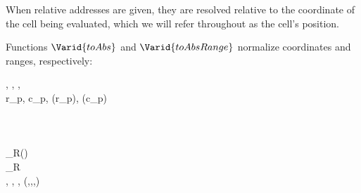 When relative addresses are given, they are resolved relative to the
coordinate of the cell being evaluated, which we will refer throughout as the
cell's position.

Functions \ensuremath{\Varid{toAbs}} and \ensuremath{\Varid{toAbsRange}} normalize coordinates and ranges, respectively:

\begin{hscode}\SaveRestoreHook
{}%
%
%
%
%
%
%
%
%
%
%
%
\>[B]{}\mathbin{::}\llparenthesis \cdot , \cdot \rrparenthesis \to \llparenthesis \cdot , \cdot \rrparenthesis \to \llparenthesis \cdot , \cdot \rrparenthesis {}\<[E]%
\\
\>[B]{}\;\llparenthesis r_p, c_p\rrparenthesis \;\llparenthesis {}, \rrparenthesis \mathrel{=}\llparenthesis (\;r_p\;), (\;c_p\;)\rrparenthesis {}\<[E]%
\\
\>[B]{}\<[4]%
\>[4]{}\<[E]%
\\
\>[4]{}\<[7]%
\>[7]{}\mathbin{::}\to {}\to {}\<[E]%
\\
\>[4]{}\<[7]%
\>[7]{}\;{}\<[16]%
\>[16]{}\anonymous \;{}\<[32]%
\>[32]{}\langle \anonymous \rangle {}\<[45]%
\>[45]{}\mathrel{=}\<[E]%
\\
\>[4]{}\<[7]%
\>[7]{}\;{}\<[16]%
\>[16]{}\langle {}\rangle \;{}\<[32]%
\>[32]{}\langle {}\rangle_{R}{}\<[45]%
\>[45]{}\mathrel{=}\langle (\mathbin{+})\rangle {}\<[E]%
\\
\>[4]{}\<[7]%
\>[7]{}\;{}\<[16]%
\>[16]{}\langle \anonymous \rangle_{R}\;{}\<[32]%
\>[32]{}\anonymous {}\<[45]%
\>[45]{}\mathrel{=}\bot {}\<[E]%
\\[\blanklineskip]%
\>[B]{}\mathbin{::}\llparenthesis \cdot , \cdot \rrparenthesis \to \llparenthesis \cdot , \cdot \rrparenthesis \to \llparenthesis \cdot , \cdot \rrparenthesis \to (,,,){}\<[E]%

\end{hscode}
